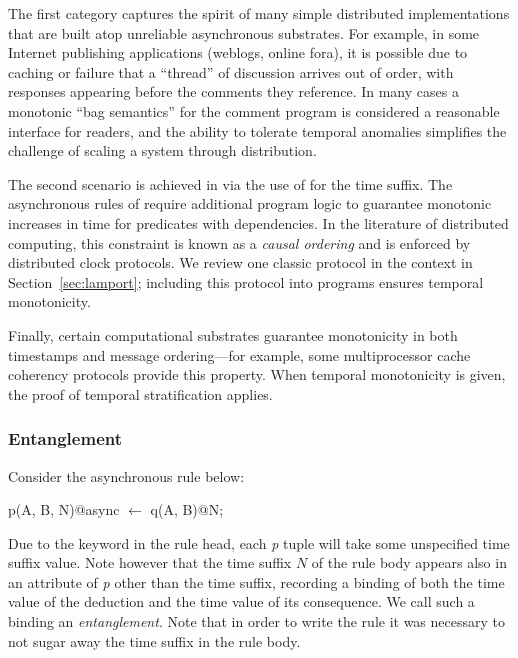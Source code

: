 The first category captures the spirit of many simple distributed implementations that are built atop unreliable asynchronous substrates.  For example, in some Internet publishing applications (weblogs, online fora), it is possible due to caching or failure that a ``thread'' of discussion arrives out of order, with responses appearing before the comments they reference.  In many cases a monotonic ``bag semantics'' for the comment program is considered a reasonable interface for readers, and the ability to tolerate temporal anomalies simplifies the challenge of scaling a system through distribution.

The second scenario is achieved in \slang via the use of  for the time suffix. The asynchronous rules of \lang require additional program logic to guarantee monotonic increases in time for predicates with dependencies.  In the literature of distributed computing, this constraint is known as a {\em causal ordering} and is enforced by distributed clock protocols.  We review one classic protocol in the \lang context in Section~\ref{sec:lamport}; including this protocol into \lang programs ensures temporal monotonicity.

Finally, certain computational substrates guarantee monotonicity in both timestamps and message ordering---for example, some multiprocessor cache coherency protocols provide this property.  When temporal monotonicity is given, the proof of temporal stratification 
applies.

\subsubsection{Entanglement}
\label{sec:entangle}
Consider the asynchronous rule below:

\begin{Dedalus}
p(A, B, N)@async \(\leftarrow\) q(A, B)@N;
\end{Dedalus}

\noindent
Due to the  keyword in the rule head, each \emph{p} tuple will take some unspecified time suffix value.
Note however that the time suffix $N$ of the rule body appears also in an attribute of \emph{p} other than the time suffix, recording a 
binding of both the time value of the deduction and the time value of its consequence.  We call such a binding
an \emph{entanglement}.   Note that in order
to write the rule it was necessary to not sugar away the time suffix in the rule body.  

